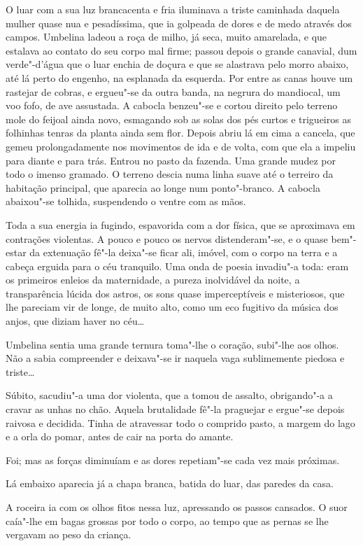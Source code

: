 O luar com a sua luz brancacenta e fria iluminava a triste caminhada
daquela mulher quase nua e pesadíssima, que ia golpeada de dores e de
medo através dos campos. Umbelina ladeou a roça de milho, já seca, muito
amarelada, e que estalava ao contato do seu corpo mal firme; passou
depois o grande canavial, dum verde"-d'água que o luar enchia de doçura e
que se alastrava pelo morro abaixo, até lá perto do engenho, na
esplanada da esquerda. Por entre as canas houve um rastejar de cobras, e
ergueu"-se da outra banda, na negrura do mandiocal, um voo fofo, de ave
assustada. A cabocla benzeu"-se e cortou direito pelo terreno mole do
feijoal ainda novo, esmagando sob as solas dos pés curtos e trigueiros
as folhinhas tenras da planta ainda sem flor. Depois abriu lá em cima a
cancela, que gemeu prolongadamente nos movimentos de ida e de volta, com
que ela a impeliu para diante e para trás. Entrou no pasto da fazenda.
Uma grande mudez por todo o imenso gramado. O terreno descia numa linha
suave até o terreiro da habitação principal, que aparecia ao longe num
ponto"-branco. A cabocla abaixou"-se tolhida, suspendendo o ventre com as
mãos.

Toda a sua energia ia fugindo, espavorida com a dor física, que se
aproximava em contrações violentas. A pouco e pouco os nervos
distenderam"-se, e o quase bem"-estar da extenuação fê"-la deixa"-se ficar
ali, imóvel, com o corpo na terra e a cabeça erguida para o céu
tranquilo. Uma onda de poesia invadiu"-a toda: eram os primeiros enleios
da maternidade, a pureza inolvidável da noite, a transparência lúcida
dos astros, os sons quase imperceptíveis e misteriosos, que lhe pareciam
vir de longe, de muito alto, como um eco fugitivo da música dos anjos,
que diziam haver no céu\ldots{}

Umbelina sentia uma grande ternura toma"-lhe o coração, subi"-lhe aos
olhos. Não a sabia compreender e deixava"-se ir naquela vaga sublimemente
piedosa e triste\ldots{}

Súbito, sacudiu"-a uma dor violenta, que a tomou de assalto, obrigando"-a
a cravar as unhas no chão. Aquela brutalidade fê"-la praguejar e
ergue"-se depois raivosa e decidida. Tinha de atravessar todo o comprido
pasto, a margem do lago e a orla do pomar, antes de cair na porta do
amante.

Foi; mas as forças diminuíam e as dores repetiam"-se cada vez mais
próximas.

Lá embaixo aparecia já a chapa branca, batida do luar, das paredes da
casa.

A roceira ia com os olhos fitos nessa luz, apressando os passos
cansados. O suor caía"-lhe em bagas grossas por todo o corpo, ao tempo
que as pernas se lhe vergavam ao peso da criança.

